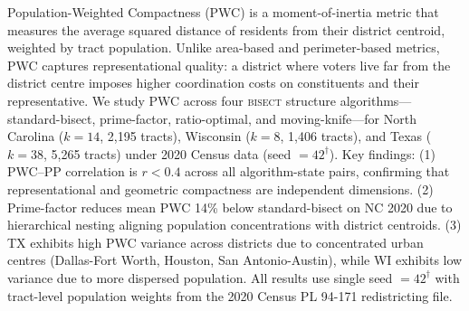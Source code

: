 Population-Weighted Compactness (PWC) is a moment-of-inertia metric that measures
the average squared distance of residents from their district centroid,
weighted by tract population.
Unlike area-based and perimeter-based metrics, PWC captures representational quality:
a district where voters live far from the district centre imposes higher coordination
costs on constituents and their representative.
We study PWC across four \textsc{bisect} structure algorithms---standard-bisect,
prime-factor, ratio-optimal, and moving-knife---for North Carolina ($k=14$, 2{,}195 tracts),
Wisconsin ($k=8$, 1{,}406 tracts), and Texas ($k=38$, 5{,}265 tracts)
under 2020 Census data (seed $= 42^\dagger$).
Key findings:
(1) PWC--PP correlation is $r < 0.4$ across all algorithm-state pairs,
confirming that representational and geometric compactness are independent dimensions.
(2) Prime-factor reduces mean PWC 14\% below standard-bisect on NC 2020
due to hierarchical nesting aligning population concentrations with district centroids.
(3) TX exhibits high PWC variance across districts due to concentrated urban centres
(Dallas-Fort Worth, Houston, San Antonio-Austin), while WI exhibits low variance
due to more dispersed population.
All results use single seed $= 42^\dagger$ with tract-level population weights
from the 2020 Census PL 94-171 redistricting file.
